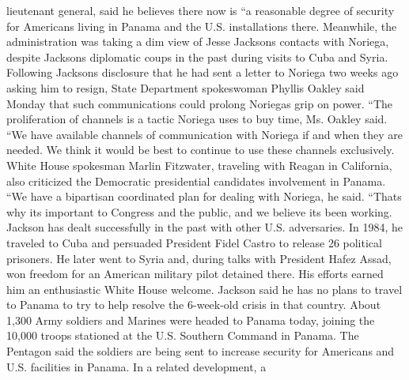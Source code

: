 \documentclass{article}
\begin{document}
\color[rgb]{0.9137254901960784,0.34509803921568627,0.1568627450980392}lieutenant general, said he believes there now is ``a reasonable degree of security for \color[rgb]{0.8666666666666667,0.11372549019607843,0.5411764705882353}Americans living in Panama and the U.S. installations there. \color[rgb]{0.9137254901960784,0.34509803921568627,0.1568627450980392}Meanwhile, the administration was taking a dim view of Jesse Jacksons contacts with Noriega, despite Jacksons \color[rgb]{0.8666666666666667,0.11372549019607843,0.5411764705882353}diplomatic coups in the past during visits to Cuba and Syria. \color[rgb]{0.9137254901960784,0.34509803921568627,0.1568627450980392}Following Jacksons disclosure that he had sent a letter to Noriega two weeks ago asking him to resign, State Department spokeswoman Phyllis Oakley said Monday that such communications could prolong Noriegas \color[rgb]{0.3333333333333333,0.6588235294117647,0.9686274509803922}grip on \color[rgb]{0.8666666666666667,0.11372549019607843,0.5411764705882353}power. ``The proliferation of channels is a \color[rgb]{0.9137254901960784,0.34509803921568627,0.1568627450980392}tactic Noriega uses to buy time, Ms. Oakley said. ``We have available \color[rgb]{0.8666666666666667,0.11372549019607843,0.5411764705882353}channels of \color[rgb]{0.9137254901960784,0.34509803921568627,0.1568627450980392}communication with Noriega if and when they are needed. We think it would be best to continue to use \color[rgb]{0.8666666666666667,0.11372549019607843,0.5411764705882353}these channels exclusively. White House spokesman Marlin Fitzwater, traveling with \color[rgb]{0.3333333333333333,0.6588235294117647,0.9686274509803922}Reagan in California, also criticized the Democratic presidential candidates \color[rgb]{0.9137254901960784,0.34509803921568627,0.1568627450980392}involvement in Panama. ``We have a bipartisan coordinated plan for dealing with Noriega, he said. ``Thats why its important to Congress and the public, and we believe its been working. Jackson has \color[rgb]{0.8666666666666667,0.11372549019607843,0.5411764705882353}dealt successfully in the past with other U.S. adversaries. In 1984, he traveled to Cuba and persuaded President Fidel Castro to release 26 political prisoners. He later went to Syria and, during talks with President Hafez Assad, \color[rgb]{0.9137254901960784,0.34509803921568627,0.1568627450980392}won freedom for an American military pilot detained there. His efforts earned him an \color[rgb]{0.3333333333333333,0.6588235294117647,0.9686274509803922}enthusiastic White House welcome. Jackson said he has no \color[rgb]{0.9137254901960784,0.34509803921568627,0.1568627450980392}plans to travel to Panama to try to \color[rgb]{0.8666666666666667,0.11372549019607843,0.5411764705882353}help resolve the 6-week-old crisis in that country. About 1,300 Army soldiers and Marines were headed to \color[rgb]{0.9137254901960784,0.34509803921568627,0.1568627450980392}Panama today, joining the 10,000 \color[rgb]{0.8666666666666667,0.11372549019607843,0.5411764705882353}troops stationed at the U.S. Southern Command in Panama. The Pentagon said the soldiers are being sent to increase security for Americans and U.S. facilities in \color[rgb]{0.9137254901960784,0.34509803921568627,0.1568627450980392}Panama. In a related development, a 
\end{document}
